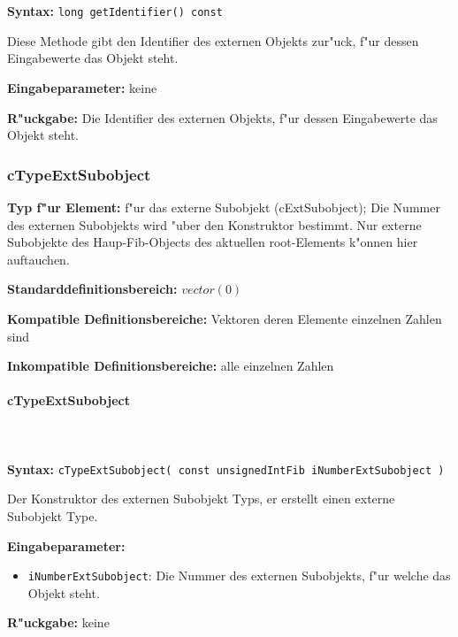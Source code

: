 \ \\\\\noindent
\textbf{Syntax:} \verb|long getIdentifier() const|

\bigskip\noindent
Diese Methode gibt den Identifier des externen Objekts zur"uck, f"ur dessen Eingabewerte das Objekt steht.

\bigskip\noindent
\textbf{Eingabeparameter:} keine

\bigskip\noindent
\textbf{R"uckgabe:} Die Identifier des externen Objekts, f"ur dessen Eingabewerte das Objekt steht.



\subsubsection{cTypeExtSubobject}

\textbf{Typ f"ur Element:} f"ur das externe Subobjekt (cExtSubobject); Die Nummer des externen Subobjekts wird "uber den Konstruktor bestimmt. Nur externe Subobjekte des Haup-Fib-Objects des aktuellen root-Elements k"onnen hier auftauchen.

\bigskip\noindent
\textbf{Standarddefinitionsbereich:} $vector( 0 )$

\bigskip\noindent
\textbf{Kompatible Definitionsbereiche:} Vektoren deren Elemente einzelnen Zahlen sind

\bigskip\noindent
\textbf{Inkompatible Definitionsbereiche:} alle einzelnen Zahlen


\paragraph{cTypeExtSubobject}

\ \\\\\noindent
\textbf{Syntax:} \verb|cTypeExtSubobject( const unsignedIntFib iNumberExtSubobject )|

\bigskip\noindent
Der Konstruktor des externen Subobjekt Typs, er erstellt einen externe Subobjekt Type.

\bigskip\noindent
\textbf{Eingabeparameter:}
\begin{itemize}
 \item \verb|iNumberExtSubobject|: Die Nummer des externen Subobjekts, f"ur welche das Objekt steht.
\end{itemize}

\bigskip\noindent
\textbf{R"uckgabe:} keine


